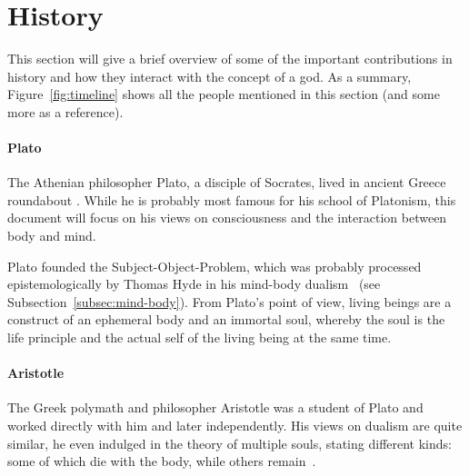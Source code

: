 \section{History}
\label{sec:History}

\begin{figure*}
    \caption[The Timeline]{Timeline of the presented persons. Those grayed out are left as a reference for other mentions in this document~\cite{wikimedia2021}. Rounded rectangles ( and ) denote the full life span of the respective person.}
    \label{fig:timeline}
\end{figure*}

This section will give a brief overview of some of the important contributions in history and how they interact with the concept of a god.
As a summary, Figure~\ref{fig:timeline} shows all the people mentioned in this section (and some more as a reference).

\paragraph{Plato}
The Athenian philosopher Plato, a disciple of Socrates, lived in ancient Greece roundabout .
While he is probably most famous for his school of Platonism, this document will focus on his views on consciousness and the interaction between body and mind.

Plato founded the Subject-Object-Problem, which was probably processed epistemologically by Thomas Hyde in his mind-body dualism~\cite{plato360} (see Subsection~\ref{subsec:mind-body}).
From Plato's point of view, living beings are a construct of an ephemeral body and an immortal soul, whereby the soul is the life principle and the actual self of the living being at the same time.


\paragraph{Aristotle}
The Greek polymath and philosopher Aristotle was a student of Plato and worked directly with him and later independently.
His views on dualism are quite similar, he even indulged in the theory of multiple souls, stating different kinds: some of which die with the body, while others remain~\cite{aristotle350,hicks2015aristotle}.

